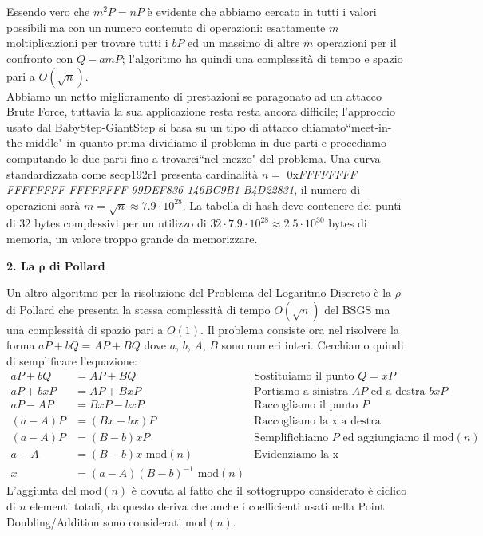 \documentclass[a4paper,12pt]{tesiinfo}
\begin{document}
\\
\\
Essendo vero che $m^2P=nP$ \`e evidente che abbiamo cercato in tutti i valori possibili ma con un numero contenuto di operazioni: esattamente $m$ moltiplicazioni per trovare tutti i $bP$ ed un massimo di altre $m$ operazioni per il confronto con $Q-amP$; l'algoritmo ha quindi una complessit\`a di tempo e spazio pari a $O(\sqrt{n})$.
\\
Abbiamo un netto miglioramento di prestazioni se paragonato ad un attacco Brute Force, tuttavia la sua applicazione resta resta ancora difficile; l'approccio usato dal BabyStep-GiantStep si basa su un tipo di attacco chiamato``meet-in-the-middle" in quanto prima dividiamo il problema in due parti e procediamo computando le due parti fino a trovarci``nel mezzo" del problema. Una curva standardizzata come secp192r1 presenta cardinalit\`a $n = $ 0x\textit{FFFFFFFF FFFFFFFF FFFFFFFF 99DEF836 146BC9B1 B4D22831}, il numero di operazioni sar\`a $m = \sqrt{n} \approx 7.9 \cdot 10^{28}$. La tabella di hash deve contenere dei punti di 32 bytes complessivi per un utilizzo di $32 \cdot 7.9\cdot 10^{28} \approx 2.5 \cdot 10^{30}$ bytes di memoria, un valore troppo grande da memorizzare.
\\
\begin{center}
  \textbf{2. La $\mathbold{\rho}$ di Pollard}
\end{center}
Un altro algoritmo per la risoluzione del Problema del Logaritmo Discreto \`e la $\rho$ di Pollard che presenta la stessa complessit\`a di tempo $O(\sqrt{n})$ del BSGS ma una complessit\`a di spazio pari a $O(1)$. Il problema consiste ora nel risolvere la forma $aP + bQ = AP + BQ$ dove $a$, $b$, $A$, $B$ sono numeri interi. Cerchiamo quindi di semplificare l'equazione:
\begin{align*}
  aP + bQ &= AP + BQ &\text{Sostituiamo il punto }Q = xP\\
  aP + bxP &= AP + BxP &\text{Portiamo a sinistra $AP$ ed a destra $bxP$}\\
  aP -AP &= BxP -bxP &\text{Raccogliamo il punto }P\\
  (a -A)P &= (Bx -bx)P &\text{Raccogliamo la x a destra}\\
  (a -A)P &= (B -b)xP &\text{Semplifichiamo $P$ ed aggiungiamo il mod$(n)$}\\
  a -A &= (B -b)x\text{ mod$(n)$} &\text{Evidenziamo la x}\\
  x &= (a -A)(B -b)^{-1}\text{ mod$(n)$}
\end{align*}
L'aggiunta del mod$(n)$ \`e dovuta al fatto che il sottogruppo considerato \`e ciclico di $n$ elementi totali, da questo deriva che anche i coefficienti usati nella Point Doubling/Addition sono considerati mod$(n)$.
\end{document}
